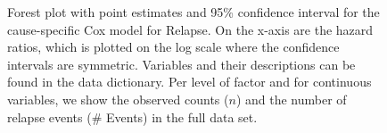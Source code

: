 \documentclass[
  letterpaper,
  paper=240mm:170mm,
  twoside=true,
  open=right,
  fontsize=10pt,
  pagesize=false,
  BCOR=15mm,
  DIV=14,
  headinclude=true,
  footinclude=false,
  headsepline=on]{scrbook}
\begin{document}
\begin{figure}


\caption{\label{fig-forest-rel}Forest plot with point estimates and 95\%
confidence interval for the cause-specific Cox model for Relapse. On the
x-axis are the hazard ratios, which is plotted on the log scale where
the confidence intervals are symmetric. Variables and their descriptions
can be found in the data dictionary. Per level of factor and for
continuous variables, we show the observed counts (\(n\)) and the number
of relapse events (\# Events) in the full data set.}

\end{figure}%
\end{document}
